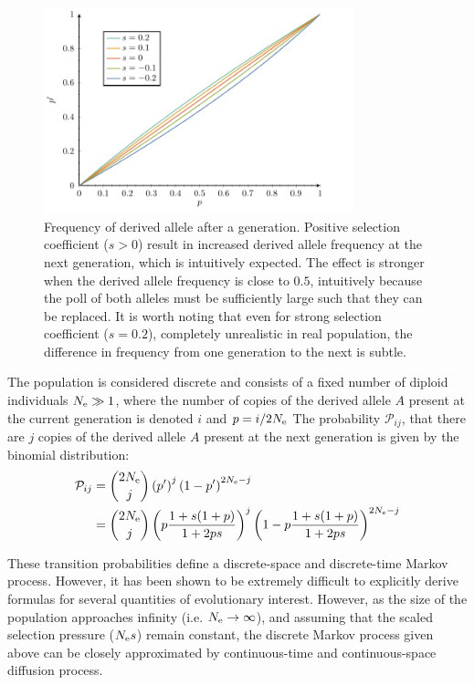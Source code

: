 \begin{figure}[H]
	\begin{center}
		\includegraphics[width=0.8\textwidth, page=1] {figures.pdf}
	\end{center}
	\caption[Frequency of derived \gls{allele} after a generation]{Frequency of derived \gls{allele} after a generation. Positive selection coefficient ($s > 0$) result in increased derived \gls{allele} frequency at the next generation, which is intuitively expected. The effect is stronger when the derived \gls{allele} frequency is close to $0.5$, intuitively because the poll of both alleles must be sufficiently large such that they can be replaced. It is worth noting that even for strong selection coefficient ($s=0.2$), completely unrealistic in real population, the difference in frequency from one generation to the next is subtle.}
\end{figure}

The population is considered discrete and consists of a fixed number of \gls{diploid} individuals $N_{\textrm{e}} \gg 1$, where the number of copies of the derived \gls{allele} $A$ present at the current generation is denoted $i$ and $p=i / 2N_{\textrm{e}} $ 
The probability $\mathcal{P}_{ij}$, that there are $j$ copies of the derived \gls{allele} $A$ present at the next generation is given by the binomial distribution:
\begin{align}
\mathcal{P}_{ij} & = \binom{2 N_{\textrm{e}}}{j} \left( p' \right)^j \left(1 - p' \right)^{2 N_{\textrm{e}} -j} \\
				 & = \binom{2 N_{\textrm{e}}}{j} \left( p\dfrac{1+s(1+p)}{1 + 2ps} \right)^j \left(1 - p\dfrac{1+s(1+p)}{1 + 2ps} \right)^{2 N_{\textrm{e}} -j}
\end{align}

These {transition} probabilities define a discrete-space and discrete-time Markov process.
However, it has been shown to be extremely difficult to explicitly derive formulas for several quantities of evolutionary interest.
However, as the size of the population approaches infinity (i.e. $ N_{\textrm{e}} \to \infty$), and assuming that the scaled selection pressure ($N_{\textrm{e}} s $) remain constant, the discrete Markov process given above can be closely approximated by continuous-time and continuous-space diffusion process.\\

